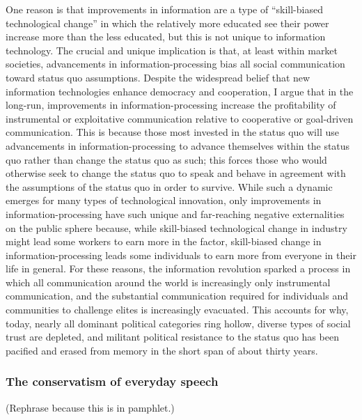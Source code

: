 \documentclass[12pt,book]{article}
\begin{document}
One reason is that improvements in information are a type of
``skill-biased technological change'' in which the relatively more
educated see their power increase more than the less educated, but this
is not unique to information technology. The crucial and unique
implication is that, at least within market societies, advancements in
information-processing bias all social communication toward status quo
assumptions. Despite the widespread belief that new information
technologies enhance democracy and cooperation, I argue that in the
long-run, improvements in information-processing increase the
profitability of instrumental or exploitative communication relative to
cooperative or goal-driven communication. This is because those most
invested in the status quo will use advancements in
information-processing to advance themselves within the status quo
rather than change the status quo as such; this forces those who would
otherwise seek to change the status quo to speak and behave in agreement
with the assumptions of the status quo in order to survive. While such a
dynamic emerges for many types of technological innovation, only
improvements in information-processing have such unique and far-reaching
negative externalities on the public sphere because, while skill-biased
technological change in industry might lead some workers to earn more in
the factor, skill-biased change in information-processing leads some
individuals to earn more from everyone in their life in general. For
these reasons, the information revolution sparked a process in which all
communication around the world is increasingly only instrumental
communication, and the substantial communication required for
individuals and communities to challenge elites is increasingly
evacuated. This accounts for why, today, nearly all dominant political
categories ring hollow, diverse types of social trust are depleted, and
militant political resistance to the status quo has been pacified and
erased from memory in the short span of about thirty years.

\subsubsection{The conservatism of everyday
speech}\label{the-conservatism-of-everyday-speech}

(Rephrase because this is in pamphlet.)
\end{document}
